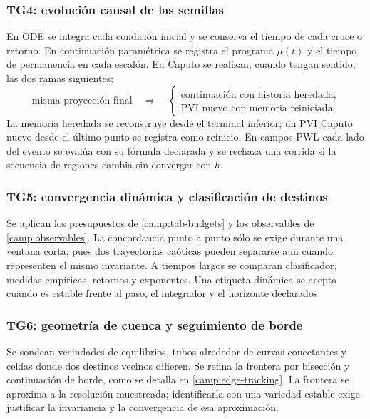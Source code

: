 \subsubsection*{TG4: evolución causal de las semillas}

En ODE se integra cada condición inicial y se conserva el tiempo de cada cruce
o retorno. En continuación paramétrica se registra el programa
\(\mu(t)\) y el tiempo de permanencia en cada escalón. En Caputo se realizan,
cuando tengan sentido, las dos ramas siguientes:
\begin{equation}
 \text{misma proyección final}\quad\Longrightarrow\quad
 \begin{cases}
   \text{continuación con historia heredada},\\
   \text{PVI nuevo con memoria reiniciada}.
 \end{cases}
 \label{camp:eq-history-pair}
\end{equation}
La memoria heredada se reconstruye desde el terminal inferior; un PVI Caputo
nuevo desde el último punto se registra como reinicio. En campos PWL cada lado del
evento se evalúa con su fórmula declarada y se rechaza una corrida si la
secuencia de regiones cambia sin converger con \(h\).

\subsubsection*{TG5: convergencia dinámica y clasificación de destinos}

Se aplican los presupuestos de \cref{camp:tab-budgets} y los observables de
\cref{camp:observables}. La concordancia punto a punto sólo se exige durante
una ventana corta, pues dos trayectorias caóticas pueden separarse aun cuando
representen el mismo invariante. A tiempos largos se comparan clasificador,
medidas empíricas, retornos y exponentes. Una etiqueta dinámica se acepta
cuando es estable frente al paso, el integrador y el horizonte declarados.

\ifHAFOBasinMaterial
\subsubsection*{TG6: geometría de cuenca y seguimiento de borde}

Se sondean vecindades de equilibrios, tubos alrededor de curvas conectantes y
celdas donde dos destinos vecinos difieren. Se refina la frontera por
bisección y continuación de borde, como se detalla en
\cref{camp:edge-tracking}. La frontera se aproxima a la resolución
muestreada; identificarla con una variedad estable exige justificar la
invariancia y la convergencia de esa aproximación.
\fi

